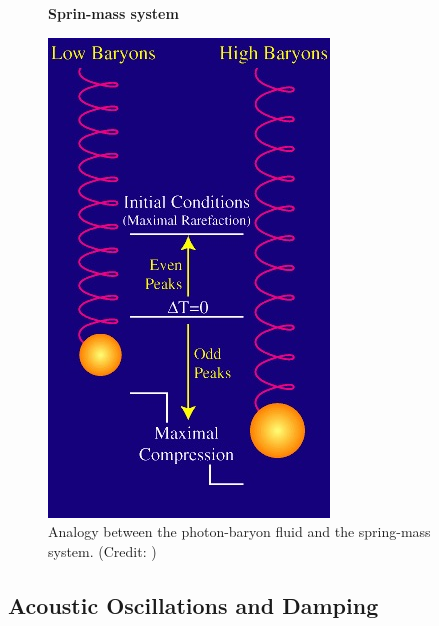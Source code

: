 \documentclass{article}
\begin{document}
\begin{figure}
\centering
\textbf{Sprin-mass system}\par\medskip
\centering
\includegraphics[scale=0.4]{baryonspring}
\caption{Analogy between the photon-baryon fluid and the spring-mass system. (Credit: \cite{huweb})}
\label{baryon_spring}
\end{figure}
%
%
%
\subsection{Acoustic Oscillations and Damping}
\end{document}
